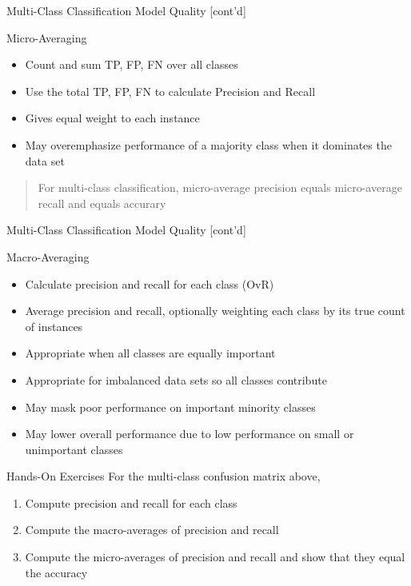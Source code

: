 \documentclass[ignorenonframetext,xcolor=x11names]{beamer}
\begin{document}
\begin{frame}{Multi-Class Classification Model Quality \small [cont'd]}
\begin{block}{Micro-Averaging}
\begin{itemize} 
  \item Count and sum TP, FP, FN over all classes
  \item Use the total TP, FP, FN to calculate Precision and Recall
\end{itemize}
\end{block}

\begin{itemize}
  \item Gives equal weight to each instance
  \item May overemphasize performance of a majority class when it dominates the data set
\end{itemize}

\begin{quote} \large
For multi-class classification, micro-average precision equals micro-average recall and equals accurary
\end{quote}
\end{frame}

\begin{frame}{Multi-Class Classification Model Quality \small [cont'd]}
\begin{block}{Macro-Averaging}
\begin{itemize} 
  \item Calculate precision and recall for each class (OvR)
  \item Average precision and recall, optionally weighting each class by its true count of instances
\end{itemize}
\end{block}

\begin{itemize}
   \item Appropriate when all classes are equally important
   \item Appropriate for imbalanced data sets so all classes contribute
   \item May mask poor performance on important minority classes
   \item May lower overall performance due to low performance on small or unimportant classes
\end{itemize}
\end{frame}

\begin{frame}{Hands-On Exercises}
For the multi-class confusion matrix above,
\begin{enumerate}
  \item Compute precision and recall for each class
  \item Compute the macro-averages of precision and recall
  \item Compute the micro-averages of precision and recall and show that they equal the accuracy
\end{enumerate}
\end{frame}
\end{document}
